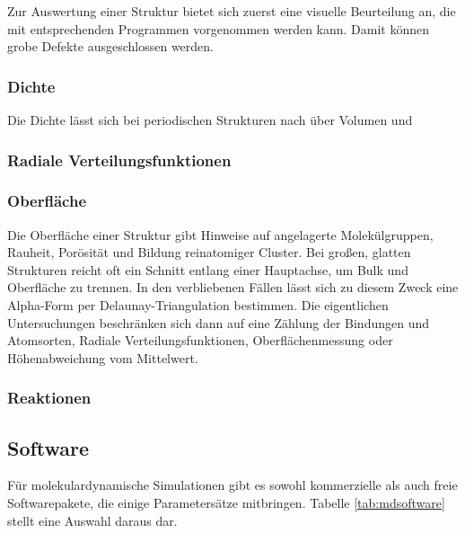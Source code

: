 Zur Auswertung einer Struktur bietet sich zuerst eine visuelle Beurteilung an, die mit entsprechenden Programmen vorgenommen werden kann.
Damit können grobe Defekte ausgeschlossen werden.

\subsubsection{Dichte}

Die Dichte lässt sich bei periodischen Strukturen nach über Volumen und 

\subsubsection{Radiale Verteilungsfunktionen}

\subsubsection{Oberfläche}

Die Oberfläche einer Struktur gibt Hinweise auf angelagerte Molekülgruppen, Rauheit, Porösität und Bildung reinatomiger Cluster.
Bei großen, glatten Strukturen reicht oft ein Schnitt entlang einer Hauptachse, um Bulk und Oberfläche zu trennen.
In den verbliebenen Fällen lässt sich zu diesem Zweck eine Alpha-Form per Delaunay-Triangulation bestimmen. 
Die eigentlichen Untersuchungen beschränken sich dann auf eine Zählung der Bindungen und Atomsorten, Radiale Verteilungsfunktionen, Oberflächenmessung oder Höhenabweichung vom Mittelwert.

\subsubsection{Reaktionen}



\subsection{Software}

Für molekulardynamische Simulationen gibt es sowohl kommerzielle als auch freie Softwarepakete, die einige Parametersätze mitbringen.
Tabelle \ref{tab:mdsoftware} stellt eine Auswahl daraus dar.

